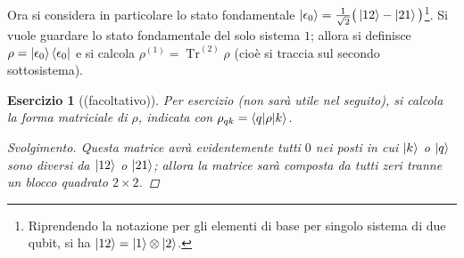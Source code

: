 \documentclass[11pt, a4paper]{scrartcl} %
\numberwithin{equation}{subsection}
\theoremstyle{style2}
\theoremstyle{style1}
\newtheorem{esercizio}{Esercizio}[section]
\renewcommand\qedsymbol{$\blacksquare$}
\newenvironment{svolgimento}{\renewcommand\qedsymbol{$\spadesuit$}\begin{proof}[Svolgimento]}{\end{proof}}
\newenvironment{boxenv}[1][]{
    \begin{eqbox}[#1]
    }{
   \end{eqbox}
}
\begin{document}
Ora si considera in particolare lo stato fondamentale $\ket{\epsilon _0} = \frac{1}{\sqrt{2} }\big(\ket{12} - \ket{21} \big)$\footnote{Riprendendo la notazione per gli elementi di base per singolo sistema di due qubit, si ha $\ket{12} = \ket{1} \otimes \ket{2}$.}. 
Si vuole guardare lo stato fondamentale del solo sistema $1$; allora si definisce $\rho = \ket{\epsilon _0} \bra{\epsilon _0} $ e si calcola $\rho ^{(1)} = \operatorname{Tr} ^{(2)} \rho $ (cio\`e si traccia sul secondo sottosistema).
\begin{boxenv}[]
	\begin{esercizio}[(facoltativo)]
Per esercizio (non sar\`a utile nel seguito), si calcola la forma matriciale di $\rho $, indicata con $\rho _{qk}=\braket{q|\rho |k}  $. 
\begin{svolgimento}
Questa matrice avr\`a evidentemente tutti $0$ nei posti in cui $\ket{k}$ o $\ket{q} $ sono diversi da $\ket{12} $ o $\ket{21} $; allora la matrice sar\`a composta da tutti zeri tranne un blocco quadrato $2\times 2$.


\end{svolgimento}
\end{esercizio}
\end{boxenv}
\end{document}
